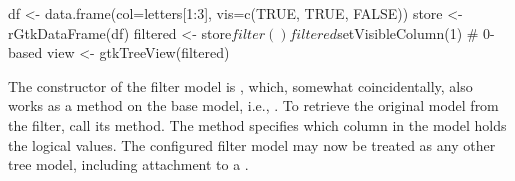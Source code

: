 \begin{Schunk}
\begin{Sinput}
 df <- data.frame(col=letters[1:3], vis=c(TRUE, TRUE, FALSE))
 store <- rGtkDataFrame(df)
 filtered <- store$filter()
 filtered$setVisibleColumn(1)            # 0-based
 view <- gtkTreeView(filtered)
\end{Sinput}
\end{Schunk}
%
The constructor of the filter model is ,
which, somewhat coincidentally, also works as a method on the base
model, i.e., . To retrieve the original model
from the filter, call its  method. The method
 specifies which column
in the model holds the logical values.  The configured filter model
may now be treated as any other tree model, including attachment to a
.




